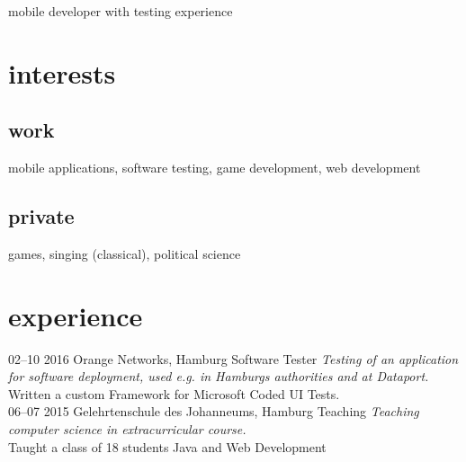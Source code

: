 \documentclass[]{friggeri-cv}
\begin{document}
       {mobile developer with testing experience}



\section{interests}
  \subsection{work}
    mobile applications, software testing, game development, web development
  \subsection{private}
    games, singing (classical), political science


\section{experience}

\begin{entrylist}
  \entry
    {02–10 2016}
    {Orange Networks, Hamburg}
    {Software Tester}
    {\emph{Testing of an application for software deployment, used e.g. in Hamburgs authorities and at Dataport.}\\
    Written a custom Framework for Microsoft Coded UI Tests.} \\
  \entry
    {06–07 2015}
    {Gelehrtenschule des Johanneums, Hamburg}
    {Teaching}
    {\emph{Teaching computer science in extracurricular course.}\\
    Taught a class of 18 students Java and Web Development}
\end{entrylist}
\end{document}
